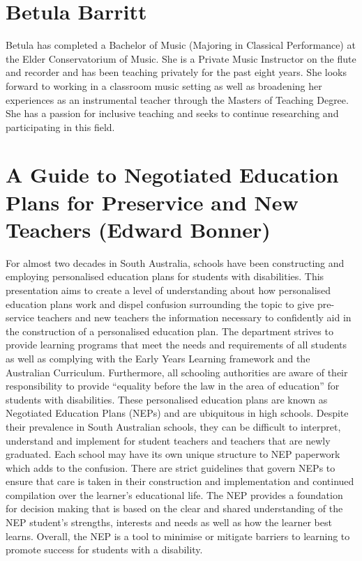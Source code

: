 \documentclass[twoside,14pt,a4paper,notitlepage]{memoir}
\begin{document}
\section*{Betula Barritt}

Betula has completed a Bachelor of Music (Majoring in Classical Performance) at the Elder Conservatorium of Music. She is a Private Music Instructor on the flute and recorder and has been teaching privately for the past eight years. She looks forward to working in a classroom music setting as well as broadening her experiences as an instrumental teacher through the Masters of Teaching Degree. She has a passion for inclusive teaching and seeks to continue researching and participating in this field.



\section*{A Guide to Negotiated Education Plans for Preservice and New Teachers (Edward Bonner)}
\label{aut:bonner}

For almost two decades in South Australia, schools have been constructing and employing personalised education plans for students with disabilities. This presentation aims to create a level of understanding about how personalised education plans work and dispel confusion surrounding the topic to give pre-service teachers and new teachers the information necessary to confidently aid in the construction of a personalised education plan. The department strives to provide learning programs that meet the needs and requirements of all students as well as complying with the Early Years Learning framework and the Australian Curriculum. Furthermore, all schooling authorities are aware of their responsibility to provide “equality before the law in the area of education” for students with disabilities. These personalised education plans are known as Negotiated Education Plans (NEPs) and are ubiquitous in high schools. Despite their prevalence in South Australian schools, they can be difficult to interpret, understand and implement for student teachers and teachers that are newly graduated. Each school may have its own unique structure to NEP paperwork which adds to the confusion. There are strict guidelines that govern NEPs to ensure that care is taken in their construction and implementation and continued compilation over the learner’s educational life. The NEP provides a foundation for decision making that is based on the clear and shared understanding of the NEP student’s strengths, interests and needs as well as how the learner best learns. Overall, the NEP is a tool to minimise or mitigate barriers to learning to promote success for students with a disability.
\end{document}
